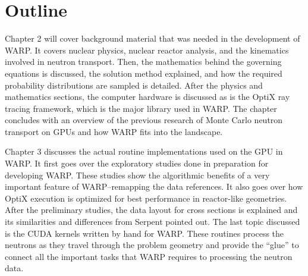 
\section{Outline}

Chapter 2 will cover background material that was needed in the development of WARP.  It covers nuclear physics, nuclear reactor analysis, and the kinematics involved in neutron transport.  Then, the mathematics behind the governing equations is discussed, the solution method explained, and how the required probability distributions are sampled is detailed.  After the physics and mathematics sections, the computer hardware is discussed as is the OptiX ray tracing framework, which is the major library used in WARP.  The chapter concludes with an overview of the previous research of Monte Carlo neutron transport on GPUs and how WARP fits into the landscape.

Chapter 3 discusses the actual routine implementations used on the GPU in WARP.  It first goes over the exploratory studies done in preparation for developing WARP.  These studies show the algorithmic benefits of a very important feature of WARP--remapping the data references.  It also goes over how OptiX execution is optimized for best performance in reactor-like geometries.  After the preliminary studies, the data layout for cross sections is explained and its similarities and differences from Serpent pointed out.  The last topic discussed is the CUDA kernels written by hand for WARP.  These routines process the neutrons as they travel through the problem geometry and provide the ``glue'' to connect all the important tasks that WARP requires to processing the neutron data.

